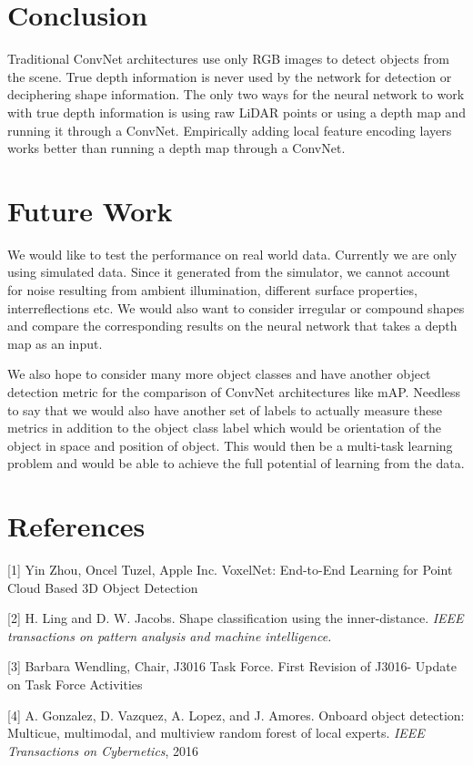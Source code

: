 \documentclass{article}
\begin{document}
\section{Conclusion}
Traditional ConvNet architectures use only RGB images to detect objects from the scene. True depth information is never used by the network for detection or deciphering shape information. The only two ways for the neural network to work with true depth information is using raw LiDAR points or using a depth map and running it through a ConvNet. Empirically adding local feature encoding layers works better than running a depth map through a ConvNet.

\section{Future Work}
We would like to test the performance on real world data. Currently we are only using simulated data. Since it generated from the simulator, we cannot account for noise resulting from ambient illumination, different surface properties, interreflections etc. We would also want to consider irregular or compound shapes and compare the corresponding results on the neural network that takes a depth map as an input.

We also hope to consider many more object classes and have another object detection metric for the comparison of ConvNet architectures like mAP. Needless to say that we would also have another set of labels to actually measure these metrics in addition to the object class label which would be orientation of the object in space and position of object. This would then be a multi-task learning problem and would be able to achieve the full potential of learning from the data.  


\section*{References}

[1] Yin Zhou, Oncel Tuzel, Apple Inc. VoxelNet: End-to-End Learning for Point Cloud Based 3D Object Detection

[2] H. Ling and D. W. Jacobs. Shape classification using the inner-distance. {\it IEEE transactions on pattern analysis and machine intelligence.}

[3] Barbara Wendling, Chair, J3016 Task Force. First Revision of J3016- Update on Task Force Activities

[4] A. Gonzalez, D. Vazquez, A. Lopez, and J. Amores. Onboard object detection: Multicue, multimodal, and multiview random forest of local experts. {\it IEEE Transactions on Cybernetics}, 2016
\end{document}
